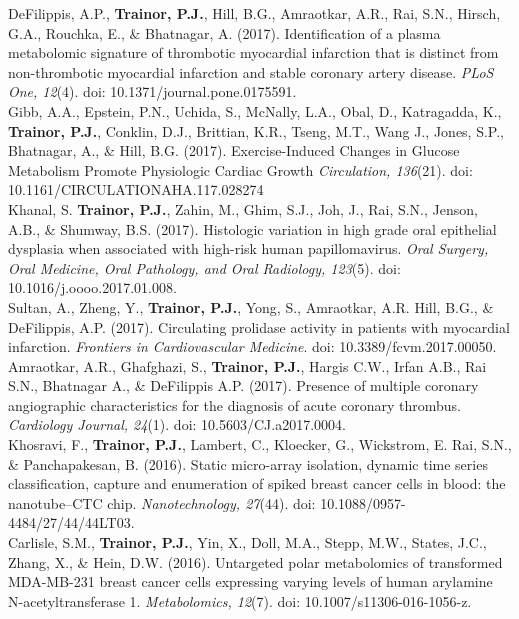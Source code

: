 \begin{DoubleSpace*}
{DeFilippis, A.P., \textbf{Trainor, P.J.}, Hill, B.G., Amraotkar, A.R., Rai, S.N., Hirsch, G.A., Rouchka, E., \& Bhatnagar, A. (2017). Identification of a plasma metabolomic signature of thrombotic myocardial infarction that is distinct from non-thrombotic myocardial infarction and stable coronary artery disease. \emph{PLoS One, 12}(4). doi: 10.1371/journal.pone.0175591. \\

Gibb, A.A., Epstein, P.N., Uchida, S., McNally, L.A., Obal, D., Katragadda, K., \textbf{Trainor, P.J.},  Conklin, D.J., Brittian, K.R., Tseng, M.T., Wang J., Jones, S.P., Bhatnagar, A., \& Hill, B.G. (2017). Exercise-Induced Changes in Glucose Metabolism Promote Physiologic Cardiac Growth \emph{Circulation, 136}(21). doi: 10.1161/CIRCULATIONAHA.117.028274 \\

Khanal, S. \textbf{Trainor, P.J.}, Zahin, M., Ghim, S.J., Joh, J., Rai, S.N., Jenson, A.B., \& Shumway, B.S. (2017). Histologic variation in high grade oral epithelial dysplasia when associated with high-risk human papillomavirus.  \emph{Oral Surgery, Oral Medicine, Oral Pathology, and Oral Radiology, 123}(5). doi: 10.1016/j.oooo.2017.01.008. \\

Sultan, A., Zheng, Y., \textbf{Trainor, P.J.}, Yong, S., Amraotkar, A.R.  Hill, B.G., \& DeFilippis, A.P. (2017). Circulating prolidase activity in patients with myocardial infarction. \emph{Frontiers in Cardiovascular Medicine}. doi: 10.3389/fcvm.2017.00050.  \\

Amraotkar, A.R., Ghafghazi, S., \textbf{Trainor, P.J.}, Hargis C.W., Irfan A.B., Rai S.N., Bhatnagar A., \& DeFilippis A.P. (2017). Presence of multiple coronary angiographic characteristics for the diagnosis of acute coronary thrombus. \emph{Cardiology Journal, 24}(1). doi: 10.5603/CJ.a2017.0004.  \\

Khosravi, F., \textbf{Trainor, P.J.}, Lambert, C., Kloecker, G., Wickstrom, E. Rai, S.N., \& Panchapakesan, B. (2016). Static micro-array isolation, dynamic time series classification, capture and enumeration of spiked breast cancer cells in blood: the nanotube--CTC chip. \emph{Nanotechnology, 27}(44). doi: 10.1088/0957-4484/27/44/44LT03.  \\

Carlisle, S.M., \textbf{Trainor, P.J.}, Yin, X., Doll, M.A., Stepp, M.W., States, J.C., Zhang, X., \& Hein, D.W. (2016). Untargeted polar metabolomics of transformed MDA-MB-231 breast cancer cells expressing varying levels of human arylamine N-acetyltransferase 1. \emph{Metabolomics, 12}(7). doi: 10.1007/s11306-016-1056-z.  \\

}
\end{DoubleSpace*}

